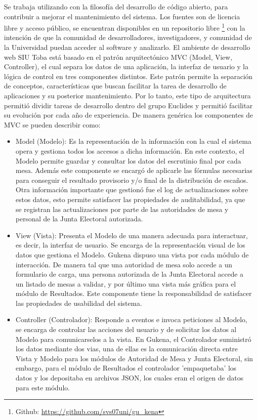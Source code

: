 Se trabaja utilizando con la filosofía del desarrollo de código abierto, para contribuir a mejorar el mantenimiento del sistema. Los fuentes son de licencia libre y acceso público, se encuentran disponibles en un repositorio libre
\footnote{Github: \url{https://github.com/svs07uni/gu_kena}} 
con la intención  de que la comunidad de desarrolladores, investigadores, y comunidad de la Universidad puedan acceder al software y analizarlo.
El ambiente de desarrollo web SIU Toba está basado en el patrón arquitectónico MVC (Model, View, Controller), el cual separa los datos de una aplicación, la interfaz de usuario y la lógica de control en tres componentes distintos.
Este patrón permite la separación de conceptos, características que buscan facilitar la tarea de desarrollo de aplicaciones y su posterior mantenimiento. Por lo tanto, este tipo de arquitectura permitió dividir tareas de desarrollo dentro del grupo Euclides y permitió facilitar su evolución por cada año de experiencia. \newline
De manera genérica los componentes de MVC se pueden describir como:
\begin{itemize}
    \item Model (Modelo): Es la representación de la información con la cual el sistema opera y gestiona todos los accesos a dicha información. En este contexto, el Modelo permite guardar y consultar los datos del escrutinio final por cada mesa. Además este componente se encargó de aplicarle las fórmulas necesarias para conseguir el resultado provisorio y/o final de la distribución de escaños. Otra información importante que gestionó fue el log de actualizaciones sobre estos datos, esto permite satisfacer las propiedades de auditabilidad, ya que se registran las actualizaciones por parte de las autoridades de mesa y personal de la Junta Electoral autorizada.
    \item View (Vista): Presenta el Modelo de una manera adecuada para interactuar, es decir, la interfaz de usuario. Se encarga de la representación visual de los datos que gestiona el Modelo. Gukena dispuso una vista por cada módulo de interacción. De manera tal que una autoridad de mesa solo accede a un formulario de carga, una persona autorizada de la Junta Electoral accede a un listado de mesas a validar, y por último una vista más gráfica para el módulo de Resultados. Este componente tiene la responsabilidad de satisfacer las propiedades de usabilidad del sistema.
    \item Controller (Controlador): Responde a eventos e invoca peticiones al Modelo, se encarga de controlar las acciones del usuario y de solicitar los datos al Modelo para comunicarselos a la vista. En Gukena, el Controlador suministró los datos mediante dos vias, una de ellas es la comunicación directa entre Vista y Modelo para los módulos de Autoridad de Mesa y Junta Electoral, sin embargo, para el módulo de Resultados el controlador 'empaquetaba' los datos y los depositaba en archivos JSON, los cuales eran el origen de datos para este módulo.
\end{itemize}
